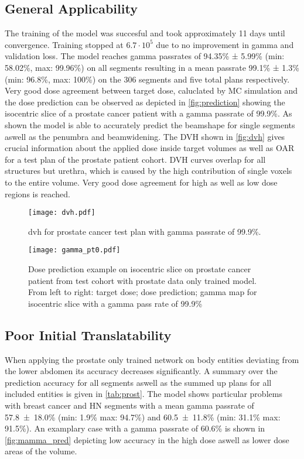 \subsection{General Applicability}

The training of the model was succesful and took approximately 11 days until convergence. Training stopped at $6.7\cdot10^5$ due to no improvement in gamma and validation loss. 
The model reaches gamma passrates of 94.35\% ± 5.99\% (min: 58.02\%, max: 99.96\%) on all segments resulting in a mean passrate 99.1\% ± 1.3\% (min: 96.8\%, max: 100\%) on the 306 segments and five total plans respectively.
Very good dose agreement between target dose, caluclated by \acs{MC} simulation and the dose prediction can be observed as depicted in \autoref{fig:prediction} showing the isocentric slice of a prostate cancer patient with a gamma passrate of 99.9\%.
As shown the model is able to accurately predict the beamshape for single segments aswell as the penumbra and beamwidening. 
The \ac{DVH} shown in \autoref{fig:dvh} gives crucial information about the applied dose inside target volumes as well as \ac{OAR} for a test plan of the prostate patient cohort.
\acs{DVH} curves overlap for all structures but urethra, which is caused by the high contribution of single voxels to the entire volume. 
Very good dose agreement for high as well as low dose regions is reached. 

\begin{figure}
    \centering
    \texttt{[image: dvh.pdf]}
    \caption{dvh for prostate cancer test plan with gamma passrate of 99.9\%.}\label{fig:dvh}
\end{figure}

\begin{figure}
    \centering
    \texttt{[image: gamma\_pt0.pdf]}
    \caption{
        Dose prediction example on isocentric slice on prostate cancer patient from test cohort with prostate data only trained model. 
        From left to right: target dose; dose prediction; gamma map for isocentric slice with a gamma pass rate of 99.9\%
    }\label{fig:prediction}
\end{figure}

\subsection{Poor Initial Translatability}

When applying the prostate only trained network on body entities deviating from the lower abdomen its accuracy decreases significantly. 
A summary over the prediction accuracy for all segments aswell as the summed up plans for all included entities is given in \autoref{tab:prost}. 
The model shows particular problems with breast cancer and \acs{HN} segments with a mean gamma passrate of 57.8~±~18.0\% (min: 1.9\% max: 94.7\%) and 60.5~±~11.8\% (min: 31.1\% max: 91.5\%). 
An examplary case with a gamma passrate of 60.6\% is shown in \autoref{fig:mamma_pred} depicting low accuracy in the high dose aswell as lower dose areas of the volume.

